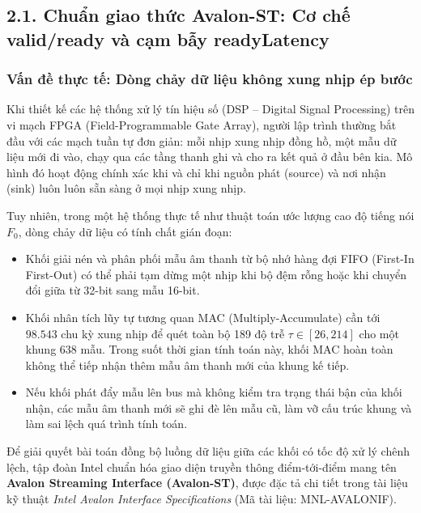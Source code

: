 \subsection*{2.1. Chuẩn giao thức Avalon-ST: Cơ chế valid/ready và cạm bẫy readyLatency}

\subsubsection*{Vấn đề thực tế: Dòng chảy dữ liệu không xung nhịp ép bước}
Khi thiết kế các hệ thống xử lý tín hiệu số (DSP -- Digital Signal Processing) trên vi mạch FPGA (Field-Programmable Gate Array), người lập trình thường bắt đầu với các mạch tuần tự đơn giản: mỗi nhịp xung nhịp đồng hồ, một mẫu dữ liệu mới đi vào, chạy qua các tầng thanh ghi và cho ra kết quả ở đầu bên kia. Mô hình đó hoạt động chính xác khi và chỉ khi nguồn phát (source) và nơi nhận (sink) luôn luôn sẵn sàng ở mọi nhịp xung nhịp.

Tuy nhiên, trong một hệ thống thực tế như thuật toán ước lượng cao độ tiếng nói $F_0$, dòng chảy dữ liệu có tính chất gián đoạn:
\begin{itemize}[leftmargin=1.5em, itemsep=2pt]
    \item Khối giải nén và phân phối mẫu âm thanh từ bộ nhớ hàng đợi FIFO (First-In First-Out) có thể phải tạm dừng một nhịp khi bộ đệm rỗng hoặc khi chuyển đổi giữa từ 32-bit sang mẫu 16-bit.
    \item Khối nhân tích lũy tự tương quan MAC (Multiply-Accumulate) cần tới $98.543$ chu kỳ xung nhịp để quét toàn bộ 189 độ trễ $\tau \in [26, 214]$ cho một khung 638 mẫu. Trong suốt thời gian tính toán này, khối MAC hoàn toàn không thể tiếp nhận thêm mẫu âm thanh mới của khung kế tiếp.
    \item Nếu khối phát đẩy mẫu lên bus mà không kiểm tra trạng thái bận của khối nhận, các mẫu âm thanh mới sẽ ghi đè lên mẫu cũ, làm vỡ cấu trúc khung và làm sai lệch quá trình tính toán.
\end{itemize}

Để giải quyết bài toán đồng bộ luồng dữ liệu giữa các khối có tốc độ xử lý chênh lệch, tập đoàn Intel chuẩn hóa giao diện truyền thông điểm-tới-điểm mang tên \textbf{Avalon Streaming Interface (Avalon-ST)}, được đặc tả chi tiết trong tài liệu kỹ thuật \emph{Intel Avalon Interface Specifications} (Mã tài liệu: MNL-AVALONIF).

